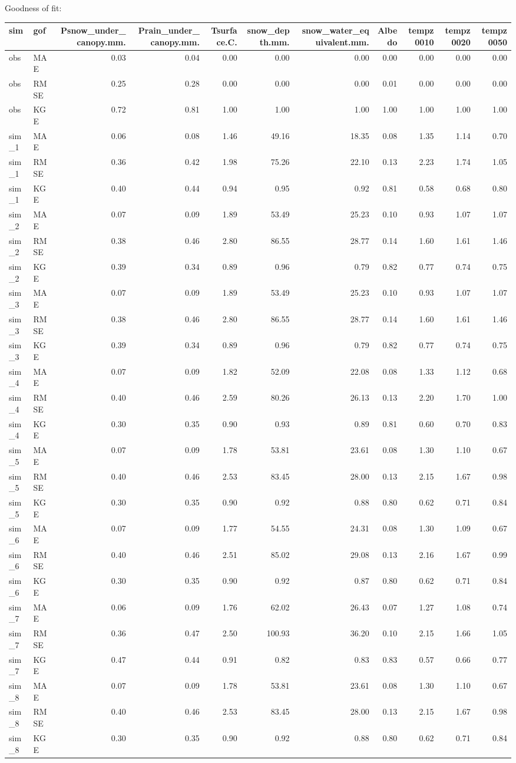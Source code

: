 \documentclass[
]{article}
\begin{document}
Goodness of fit:

\begin{longtable}[]{@{}llrrrrrrrrr@{}}
\toprule
sim & gof & Psnow\_under\_canopy.mm. & Prain\_under\_canopy.mm. &
Tsurface.C. & snow\_depth.mm. & snow\_water\_equivalent.mm. & Albedo &
tempz0010 & tempz0020 & tempz0050\tabularnewline
\midrule
\endhead
obs & MAE & 0.03 & 0.04 & 0.00 & 0.00 & 0.00 & 0.00 & 0.00 & 0.00 &
0.00\tabularnewline
obs & RMSE & 0.25 & 0.28 & 0.00 & 0.00 & 0.00 & 0.01 & 0.00 & 0.00 &
0.00\tabularnewline
obs & KGE & 0.72 & 0.81 & 1.00 & 1.00 & 1.00 & 1.00 & 1.00 & 1.00 &
1.00\tabularnewline
sim\_1 & MAE & 0.06 & 0.08 & 1.46 & 49.16 & 18.35 & 0.08 & 1.35 & 1.14 &
0.70\tabularnewline
sim\_1 & RMSE & 0.36 & 0.42 & 1.98 & 75.26 & 22.10 & 0.13 & 2.23 & 1.74
& 1.05\tabularnewline
sim\_1 & KGE & 0.40 & 0.44 & 0.94 & 0.95 & 0.92 & 0.81 & 0.58 & 0.68 &
0.80\tabularnewline
sim\_2 & MAE & 0.07 & 0.09 & 1.89 & 53.49 & 25.23 & 0.10 & 0.93 & 1.07 &
1.07\tabularnewline
sim\_2 & RMSE & 0.38 & 0.46 & 2.80 & 86.55 & 28.77 & 0.14 & 1.60 & 1.61
& 1.46\tabularnewline
sim\_2 & KGE & 0.39 & 0.34 & 0.89 & 0.96 & 0.79 & 0.82 & 0.77 & 0.74 &
0.75\tabularnewline
sim\_3 & MAE & 0.07 & 0.09 & 1.89 & 53.49 & 25.23 & 0.10 & 0.93 & 1.07 &
1.07\tabularnewline
sim\_3 & RMSE & 0.38 & 0.46 & 2.80 & 86.55 & 28.77 & 0.14 & 1.60 & 1.61
& 1.46\tabularnewline
sim\_3 & KGE & 0.39 & 0.34 & 0.89 & 0.96 & 0.79 & 0.82 & 0.77 & 0.74 &
0.75\tabularnewline
sim\_4 & MAE & 0.07 & 0.09 & 1.82 & 52.09 & 22.08 & 0.08 & 1.33 & 1.12 &
0.68\tabularnewline
sim\_4 & RMSE & 0.40 & 0.46 & 2.59 & 80.26 & 26.13 & 0.13 & 2.20 & 1.70
& 1.00\tabularnewline
sim\_4 & KGE & 0.30 & 0.35 & 0.90 & 0.93 & 0.89 & 0.81 & 0.60 & 0.70 &
0.83\tabularnewline
sim\_5 & MAE & 0.07 & 0.09 & 1.78 & 53.81 & 23.61 & 0.08 & 1.30 & 1.10 &
0.67\tabularnewline
sim\_5 & RMSE & 0.40 & 0.46 & 2.53 & 83.45 & 28.00 & 0.13 & 2.15 & 1.67
& 0.98\tabularnewline
sim\_5 & KGE & 0.30 & 0.35 & 0.90 & 0.92 & 0.88 & 0.80 & 0.62 & 0.71 &
0.84\tabularnewline
sim\_6 & MAE & 0.07 & 0.09 & 1.77 & 54.55 & 24.31 & 0.08 & 1.30 & 1.09 &
0.67\tabularnewline
sim\_6 & RMSE & 0.40 & 0.46 & 2.51 & 85.02 & 29.08 & 0.13 & 2.16 & 1.67
& 0.99\tabularnewline
sim\_6 & KGE & 0.30 & 0.35 & 0.90 & 0.92 & 0.87 & 0.80 & 0.62 & 0.71 &
0.84\tabularnewline
sim\_7 & MAE & 0.06 & 0.09 & 1.76 & 62.02 & 26.43 & 0.07 & 1.27 & 1.08 &
0.74\tabularnewline
sim\_7 & RMSE & 0.36 & 0.47 & 2.50 & 100.93 & 36.20 & 0.10 & 2.15 & 1.66
& 1.05\tabularnewline
sim\_7 & KGE & 0.47 & 0.44 & 0.91 & 0.82 & 0.83 & 0.83 & 0.57 & 0.66 &
0.77\tabularnewline
sim\_8 & MAE & 0.07 & 0.09 & 1.78 & 53.81 & 23.61 & 0.08 & 1.30 & 1.10 &
0.67\tabularnewline
sim\_8 & RMSE & 0.40 & 0.46 & 2.53 & 83.45 & 28.00 & 0.13 & 2.15 & 1.67
& 0.98\tabularnewline
sim\_8 & KGE & 0.30 & 0.35 & 0.90 & 0.92 & 0.88 & 0.80 & 0.62 & 0.71 &
0.84\tabularnewline
\bottomrule
\end{longtable}
\end{document}

